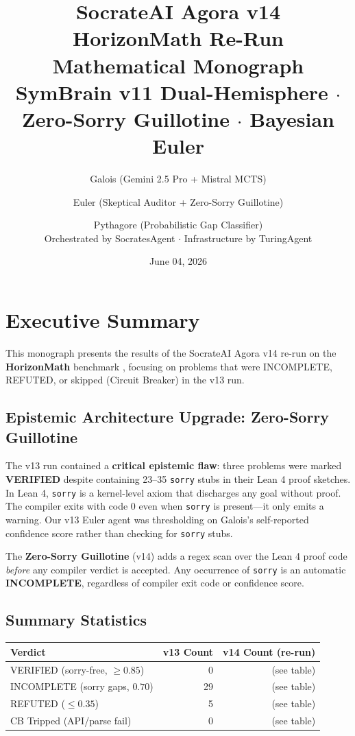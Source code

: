 \documentclass[12pt,a4paper]{article}
\title{
  \textbf{SocrateAI Agora v14}\\
  \large HorizonMath Re-Run Mathematical Monograph\\
  \normalsize SymBrain v11 Dual-Hemisphere $\cdot$ Zero-Sorry Guillotine $\cdot$ Bayesian Euler
}
\author{
  Galois (Gemini 2.5 Pro + Mistral MCTS) \and
  Euler (Skeptical Auditor + Zero-Sorry Guillotine) \and
  Pythagore (Probabilistic Gap Classifier)\\
  \small Orchestrated by SocratesAgent $\cdot$ Infrastructure by TuringAgent
}
\date{June 04, 2026}
\begin{document}
\maketitle
\tableofcontents
\newpage

\section{Executive Summary}

This monograph presents the results of the SocrateAI Agora v14 re-run on the
\textbf{HorizonMath} benchmark \cite{horizonmath2024}, focusing on problems that
were INCOMPLETE, REFUTED, or skipped (Circuit Breaker) in the v13 run.

\subsection*{Epistemic Architecture Upgrade: Zero-Sorry Guillotine}

The v13 run contained a \textbf{critical epistemic flaw}: three problems were
marked \textcolor{verifiedgreen}{\textbf{VERIFIED}} despite containing 23--35
\texttt{sorry} stubs in their Lean 4 proof sketches. In Lean 4, \texttt{sorry}
is a kernel-level axiom that discharges any goal without proof. The compiler
exits with code 0 even when \texttt{sorry} is present---it only emits a
warning. Our v13 Euler agent was thresholding on Galois's self-reported
confidence score rather than checking for \texttt{sorry} stubs.

\medskip
The \textbf{Zero-Sorry Guillotine} (v14) adds a regex scan over the Lean 4
proof code \emph{before} any compiler verdict is accepted. Any occurrence of
\texttt{sorry} is an automatic \textcolor{incompleteamber}{\textbf{INCOMPLETE}},
regardless of compiler exit code or confidence score.

\subsection*{Summary Statistics}

\begin{center}
\begin{tabular}{lrr}
\toprule
\textbf{Verdict} & \textbf{v13 Count} & \textbf{v14 Count (re-run)} \\
\midrule
\textcolor{verifiedgreen}{VERIFIED} (sorry-free, $\geq 0.85$) & 0 & (see table) \\
\textcolor{incompleteamber}{INCOMPLETE} (sorry gaps, $0.70$) & 29 & (see table) \\
\textcolor{refutedred}{REFUTED} ($\leq 0.35$) & 5 & (see table) \\
CB Tripped (API/parse fail) & 0 & (see table) \\
\bottomrule
\end{tabular}
\end{center}
\end{document}
